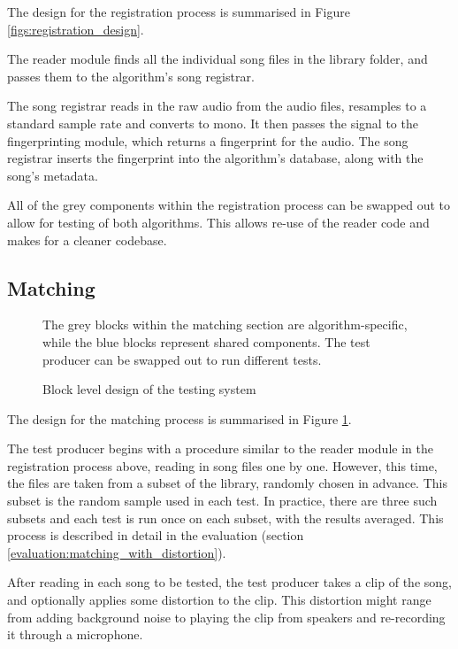 \documentclass[12pt,a4paper,twoside,openright]{report}
\begin{document}
The design for the registration process is summarised in Figure \ref{figs:registration_design}. 

The reader module finds all the individual song files in the library folder, and passes them to the algorithm's song registrar.

The song registrar reads in the raw audio from the audio files, resamples to a standard sample rate and converts to mono. It then passes the signal to the fingerprinting module, which returns a fingerprint for the audio. The song registrar inserts the fingerprint into the algorithm's database, along with the song's metadata.

All of the grey components within the registration process can be swapped out to allow for testing of both algorithms. This allows re-use of the reader code and makes for a cleaner codebase.


\subsection{Matching}

\begin{figure}[htb]
  \centering
  
  \caption{Block level design of the testing system}
  \label{figs:matching_design}
  \medskip \small
  The grey blocks within the matching section are algorithm-specific, while the blue blocks represent shared components. The test producer can be swapped out to run different tests.
\end{figure}

The design for the matching process is summarised in Figure \ref{figs:matching_design}.

The test producer begins with a procedure similar to the reader module in the registration process above, reading in song files one by one. However, this time, the files are taken from a subset of the library, randomly chosen in advance. This subset is the random sample used in each test. In practice, there are three such subsets and each test is run once on each subset, with the results averaged. This process is described in detail in the evaluation (section \ref{evaluation:matching_with_distortion}).

After reading in each song to be tested, the test producer takes a clip of the song, and optionally applies some distortion to the clip. This distortion might range from adding background noise to playing the clip from speakers and re-recording it through a microphone.
\end{document}
